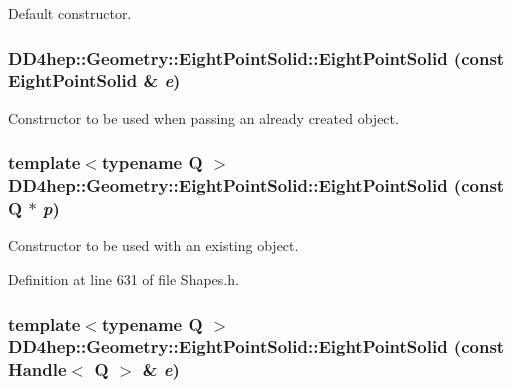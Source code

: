 Default constructor. \hypertarget{class_d_d4hep_1_1_geometry_1_1_eight_point_solid_a3b22b341fca7889ffa258b4d42cd9ccf}{
\subsubsection[{EightPointSolid}]{\setlength{\rightskip}{0pt plus 5cm}DD4hep::Geometry::EightPointSolid::EightPointSolid (const {\bf EightPointSolid} \& {\em e})}}
\label{class_d_d4hep_1_1_geometry_1_1_eight_point_solid_a3b22b341fca7889ffa258b4d42cd9ccf}


Constructor to be used when passing an already created object. \hypertarget{class_d_d4hep_1_1_geometry_1_1_eight_point_solid_ae29bd978ed1fa63973e48ba9bc9c9642}{
\subsubsection[{EightPointSolid}]{\setlength{\rightskip}{0pt plus 5cm}template$<$typename Q $>$ DD4hep::Geometry::EightPointSolid::EightPointSolid (const Q $\ast$ {\em p})}}
\label{class_d_d4hep_1_1_geometry_1_1_eight_point_solid_ae29bd978ed1fa63973e48ba9bc9c9642}


Constructor to be used with an existing object. 

Definition at line 631 of file Shapes.h.\hypertarget{class_d_d4hep_1_1_geometry_1_1_eight_point_solid_afa7511ee7f381557c3508188154327d7}{
\subsubsection[{EightPointSolid}]{\setlength{\rightskip}{0pt plus 5cm}template$<$typename Q $>$ DD4hep::Geometry::EightPointSolid::EightPointSolid (const {\bf Handle}$<$ Q $>$ \& {\em e})}}
\label{class_d_d4hep_1_1_geometry_1_1_eight_point_solid_afa7511ee7f381557c3508188154327d7}



